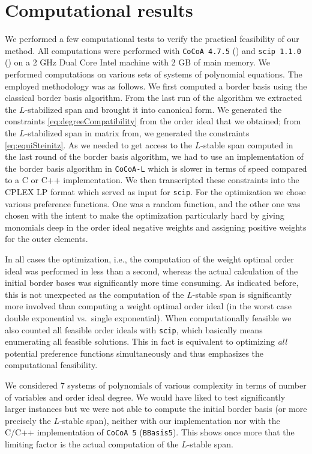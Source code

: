 \documentclass[11pt,oneside,english]{amsart}
\makeatletter
\numberwithin{equation}{section}
\numberwithin{figure}{section}
\theoremstyle{plain}
\theoremstyle{definition}
\theoremstyle{definition}
\theoremstyle{remark}
\theoremstyle{plain}
\theoremstyle{plain}
\theoremstyle{plain}
\theoremstyle{problem@}
\makeatother
\begin{document}
\section{\label{sec:Computational-results}Computational results}
We performed a few computational tests to verify the practical feasibility of
our method. All computations were performed with {\textnormal{\texttt{{CoCoA 4.7.5}}}}
(\cite{team2009cocoa}) and {\textnormal{\texttt{{scip 1.1.0}}}} (\cite{achterberg2009scip}) on
a 2 GHz Dual Core Intel machine with 2 GB of main memory. We performed
computations on various sets of systems of polynomial equations. The employed
methodology was as follows. We first computed a border basis using the
classical border basis algorithm. From the last run of the algorithm we
extracted the $L$-stabilized span and brought it into canonical form. We
generated the constraints \eqref{eq:degreeCompatibility} from the order ideal
that we obtained; from the $L$-stabilized span in matrix from, we generated
the constraints \eqref{eq:equiSteinitz}. As we needed to get access to the
$L$-stable span computed in the last round of the border basis algorithm, we
had to use an implementation of the border basis algorithm in
{\textnormal{\texttt{{CoCoA-L}}}} which is
slower in terms of speed compared to a C or C++ implementation. We then
transcripted these constraints into the CPLEX LP format which served as input
for {\textnormal{\texttt{{scip}}}}. For the optimization we chose various preference
functions.  One was a random function, and the other one was chosen with the
intent to make the optimization particularly hard by giving monomials deep in
the order ideal negative weights and assigning positive weights for the outer
elements.

In all cases the optimization, i.e., the computation of the weight optimal
order ideal was performed in less than a second, whereas the actual
calculation of the initial border bases was significantly more time consuming.
As indicated before, this is not unexpected as the computation of the
$L$-stable span is significantly more involved than computing a weight optimal
order ideal (in the worst case double exponential vs.~single exponential).
When computationally feasible we also counted all feasible order ideals with
{\textnormal{\texttt{{scip}}}}, which basically means enumerating all feasible solutions.
This in fact is equivalent to optimizing \emph{all} potential preference
functions simultaneously and thus emphasizes the
computational feasibility.

We considered $7$ systems of polynomials of various complexity in terms of
number of variables and order ideal degree. We would have liked to test
significantly larger instances but we were not able to compute the initial
border basis (or more precisely the $L$-stable span), neither with our
implementation nor with the C/C++ implementation of {\textnormal{\texttt{{CoCoA 5}}}}
({\textnormal{\texttt{{BBasis5}}}}). This shows once more that the limiting factor is the actual computation of the $L$-stable span.
\end{document}
